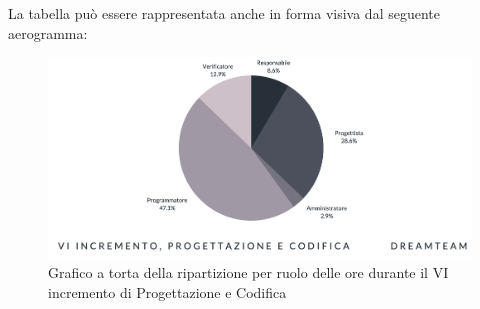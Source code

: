 La tabella può essere rappresentata anche in forma visiva dal seguente aerogramma:
\begin{figure}[H]
\centering
\includegraphics[scale=0.50]{Sezioni/SezioniPreventivo/grafici/progettazione/Progettazione_VI_incremento_costi.png}
\caption{Grafico a torta della ripartizione per ruolo delle ore durante il VI incremento di Progettazione e Codifica}
\end{figure}

\pagebreak


